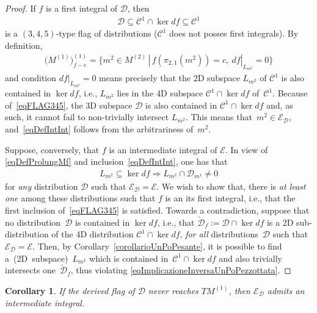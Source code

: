 \documentclass[10pt,a4paper]{amsart}
\newcommand{\C}{\mathcal{C}}
\newcommand{\D}{\mathcal{D}}
\newcommand{\E}{\mathcal{E}}
\newcommand{\Ddue}{{\check{\mathcal{D}}}}
\numberwithin{equation}{section}
\newtheorem{Corollary}[Theorem]{Corollary}
\begin{document}
\begin{proof}
 If $f$ is a f\/irst integral of $\D$, then
 \begin{gather}\label{eqFLAG345}
\D\subseteq \C^1\cap \ker df \subseteq \C^1
\end{gather}
is a $(3,4,5)$-type f\/lag of distributions ($\C^1$ does not posses f\/irst integrals). By def\/inition,
\begin{gather}\label{eqDefProlungMf}
\big(M^{(1)}\big)_{f-c}^{(1)}=\big\{m^2\in M^{(2)}\,|\, f(\pi_{2,1}(m^2))=c,\ df|_{L_{m^2}}=0\big\}
\end{gather}
and condition $df|_{L_{m^2}}=0$ means precisely that the 2D subspace $L_{m^2}$ of $\C^1$ is also contained in $\ker df$, i.e., $L_{m^2}$ lies in the 4D subspace $\C^1\cap \ker df$ of~$\C^1$. Because of~\eqref{eqFLAG345}, the 3D subspace $\D$ is also contained in $\C^1\cap \ker df$ and, as such, it cannot fail to non-trivially intersect $L_{m^2}$. This means that~$m^2\in\E_\D$, and~\eqref{eqDefIntInt} follows from the arbitrariness of~$m^2$.

Suppose, conversely, that $f$ is an intermediate integral of $\E$. In view of \eqref{eqDefProlungMf} and inclusion~\eqref{eqDefIntInt}, one has that
\begin{gather}\label{eqImplicazioneInversaUnPoPezzottata}
L_{m^2}\subseteq\ker df\Rightarrow L_{m^2}\cap\D_{m^1}\neq 0
\end{gather}
for \emph{any} distribution $\D$ such that $\E_\D=\E$. We wish to show that, there is \emph{at least one} among these distributions such that $f$ is an its f\/irst integral, i.e., that the f\/irst inclusion of~\eqref{eqFLAG345} is satisf\/ied. Towards a contradiction, suppose that no distribution~$\D$ is contained in $\ker df$, i.e., that $\Ddue_f:=\D\cap\ker df$ is a 2D sub-distribution of the 4D distribution $\C^1\cap\ker df$, \emph{for all} distributions~$\D$ such that $\E_\D=\E$. Then, by Corollary~\ref{corollarioUnPoPesante}, it is possible to f\/ind a~(2D~subspace)~$L_{m^2}$ which is contained in~$\C^1\cap\ker df$ and also trivially intersects one~$\Ddue_f$, thus violating \eqref{eqImplicazioneInversaUnPoPezzottata}.
\end{proof}

\begin{Corollary}
 If the derived flag of $\D$ never reaches $TM^{(1)}$, then $\E_\D$ admits an intermediate integral.
\end{Corollary}
\end{document}
